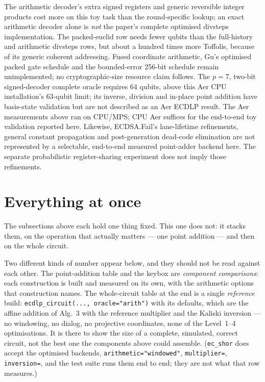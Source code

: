 \documentclass[11pt]{article}
\newcommand{\code}[1]{\texttt{#1}}
\theoremstyle{plain}
\theoremstyle{remark}
\begin{document}
The arithmetic decoder's extra signed registers and generic reversible
integer products cost more on this toy task than the round-specific lookup;
an exact arithmetic decoder alone is \emph{not} the paper's complete optimised
divsteps implementation. The packed-euclid row needs fewer qubits than the
full-history and arithmetic divsteps rows, but about a hundred times more
Toffolis, because of its generic coherent addressing. Fused coordinate arithmetic, Gu's
optimised packed gate schedule and the bounded-error 256-bit schedule remain
unimplemented; no cryptographic-size resource claim follows. The $p=7$,
two-bit signed-decoder complete oracle requires $64$ qubits, above this Aer
CPU installation's $63$-qubit limit; its inverse, division and in-place point
addition have basis-state validation but are not described as an Aer ECDLP
result.
The Aer measurements above ran on CPU/MPS; CPU Aer suffices for the end-to-end toy validation reported here.
Likewise, ECDSA.Fail's lane-lifetime refinements, general constant
propagation and post-generation dead-code elimination are not represented
by a selectable, end-to-end measured point-adder backend here. The separate
probabilistic register-sharing experiment does not imply those refinements.

\section{Everything at once}\label{ec:sec:cost}

The subsections above each hold one thing fixed. This one does not: it stacks them, on the operation
that actually matters --- one point addition --- and then on the whole circuit.

Two different kinds of number appear below, and they should not be read against each other. The
point-addition table and the keybox are \emph{component comparisons}: each construction is built
and measured on its own, with the arithmetic options that construction names. The whole-circuit
table at the end is a single \emph{reference} build: \code{ecdlp\_circuit(..., oracle="arith")}
with its defaults, which are the affine addition of Alg.~3 with the reference multiplier and the
\cite{ec:hjnrs20} Kaliski inversion --- no windowing, no dialog, no projective coordinates, none of
the Level~1--4 optimisations. It is there to show the size of a complete, simulated, correct
circuit, not the best one the components above could assemble. (\code{ec\_shor} does accept the
optimised backends, \code{arithmetic="windowed"}, \code{multiplier=}, \code{inversion=}, and the
test suite runs them end to end; they are not what that row measures.)
\end{document}
